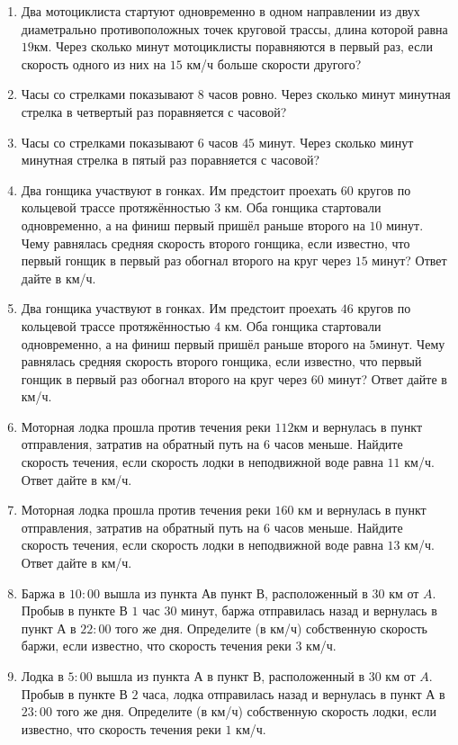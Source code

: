 \documentclass[12pt, a4paper]{article}
\begin{document}
\begin{enumerate}
		\item Два мотоциклиста стартуют одновременно в одном направлении из двух диаметрально противоположных точек круговой трассы, длина которой равна \( 19  \)км. Через сколько минут мотоциклисты поравняются в первый раз, если скорость одного из них на \( 15  \) км/ч больше скорости другого?
		\item Часы со стрелками показывают \( 8  \) часов ровно. Через сколько минут минутная стрелка в четвертый раз поравняется с часовой?
		\item Часы со стрелками показывают \( 6  \) часов \( 45  \) минут. Через сколько минут минутная стрелка в пятый раз поравняется с часовой?
		\item Два гонщика участвуют в гонках. Им предстоит проехать \(60\) кругов по кольцевой трассе протяжённостью \(3\) км. Оба гонщика стартовали одновременно, а на финиш первый пришёл раньше второго на \(10\) минут. Чему равнялась средняя скорость второго гонщика, если известно, что первый гонщик в первый раз обогнал второго на круг через \(15\) минут? Ответ дайте в км/ч.
		\item  Два гонщика участвуют в гонках. Им предстоит проехать \(46\) кругов по кольцевой трассе протяжённостью \(4\) км. Оба гонщика стартовали одновременно, а на финиш первый пришёл раньше второго на \(5\)минут. Чему равнялась средняя скорость второго гонщика, если известно, что первый гонщик в первый раз обогнал второго на круг через \(60\) минут? Ответ дайте в км/ч.
		\item Моторная лодка прошла против течения реки \( 112  \)км и вернулась в пункт отправления, затратив на обратный путь на \(6\) часов меньше. Найдите скорость течения, если скорость лодки в неподвижной воде равна \( 11  \) км/ч. Ответ дайте в км/ч.
		\item Моторная лодка прошла против течения реки \( 160  \) км и вернулась в пункт отправления, затратив на обратный путь на \( 6  \) часов меньше. Найдите скорость течения, если скорость лодки в неподвижной воде равна \( 13  \) км/ч. Ответ дайте в км/ч.
		\item Баржа в \( 10:00  \) вышла из пункта \( А  \)в пункт \( В \), расположенный в \( 30  \) км от \( A \). Пробыв в пункте \( В \)  \( 1 \) час \( 30  \) минут, баржа отправилась назад и вернулась в пункт \( А  \) в \( 22:00  \) того же дня. Определите (в км/ч) собственную скорость баржи, если известно, что скорость течения реки \( 3  \) км/ч.
		\item Лодка в \( 5:00  \) вышла из пункта \( А  \) в пункт \( В \), расположенный в \( 30  \) км от \( A \). Пробыв в пункте \( В \) \( 2 \) часа, лодка отправилась назад и вернулась в пункт \( А \) в \( 23:00 \) того же дня. Определите (в км/ч) собственную скорость лодки, если известно, что скорость течения реки \( 1 \) км/ч.

\end{enumerate}
\end{document}

